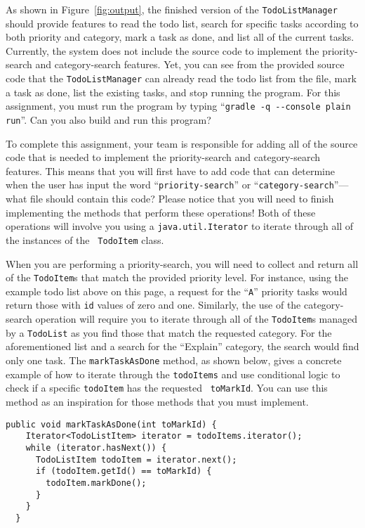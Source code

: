 \documentclass[11pt]{article}
\newcommand{\command}[1]{``\lstinline{#1}''}
\begin{document}
As shown in Figure~\ref{fig:output}, the finished version of the {\tt TodoListManager} should provide features to read
the todo list, search for specific tasks according to both priority and category, mark a task as done, and list all of
the current tasks. Currently, the system does not include the source code to implement the priority-search and
category-search features. Yet, you can see from the provided source code that the {\tt TodoListManager} can already read
the todo list from the file, mark a task as done, list the existing tasks, and stop running the program. For this
assignment, you must run the program by typing \command{gradle -q --console plain run}. Can you also build and run this
program?

To complete this assignment, your team is responsible for adding all of the source code that is needed to implement the
priority-search and category-search features. This means that you will first have to add code that can determine when
the user has input the word ``{\tt priority-search}'' or ``{\tt category-search}''---what file should contain this code?
Please notice that you will need to finish implementing the methods that perform these operations! Both of these
operations will involve you using a {\tt java.util.Iterator} to iterate through all of the instances of the {\tt
TodoItem} class.

When you are performing a priority-search, you will need to collect and return all of the {\tt TodoItem}s that match the
provided priority level. For instance, using the example todo list above on this page, a request for the ``{\tt A}''
priority tasks would return those with {\tt id} values of zero and one. Similarly, the use of the category-search
operation will require you to iterate through all of the {\tt TodoItem}s managed by a {\tt TodoList} as you find those
that match the requested category. For the aforementioned list and a search for the ``Explain'' category, the search
would find only one task. The {\tt markTaskAsDone} method, as shown below, gives a concrete example of how to iterate
through the {\tt todoItems} and use conditional logic to check if a specific {\tt todoItem} has the requested {\tt
toMarkId}. You can use this method as an inspiration for those methods that you must implement.

\vspace{-0.05in}
\begin{verbatim}
public void markTaskAsDone(int toMarkId) {
    Iterator<TodoListItem> iterator = todoItems.iterator();
    while (iterator.hasNext()) {
      TodoListItem todoItem = iterator.next();
      if (todoItem.getId() == toMarkId) {
        todoItem.markDone();
      }
    }
  }
\end{verbatim}
\end{document}
